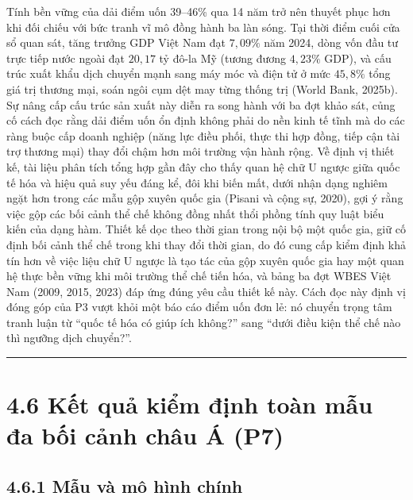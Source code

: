 \documentclass[
  a4paper,
  13pt]{extreport}
\begin{document}
Tính bền vững của dải điểm uốn 39--46\% qua 14 năm trở nên thuyết phục
hơn khi đối chiếu với bức tranh vĩ mô đồng hành ba làn sóng. Tại thời
điểm cuối cửa sổ quan sát, tăng trưởng GDP Việt Nam đạt \(7{,}09\%\) năm
2024, dòng vốn đầu tư trực tiếp nước ngoài đạt \(20{,}17\) tỷ đô-la Mỹ
(tương đương \(4{,}23\%\) GDP), và cấu trúc xuất khẩu dịch chuyển mạnh
sang máy móc và điện tử ở mức \(45{,}8\%\) tổng giá trị thương mại, soán
ngôi cụm dệt may từng thống trị (World Bank, 2025b). Sự nâng cấp cấu
trúc sản xuất này diễn ra song hành với ba đợt khảo sát, củng cố cách
đọc rằng dải điểm uốn ổn định không phải do nền kinh tế tĩnh mà do các
ràng buộc cấp doanh nghiệp (năng lực điều phối, thực thi hợp đồng, tiếp
cận tài trợ thương mại) thay đổi chậm hơn môi trường vận hành rộng. Về
định vị thiết kế, tài liệu phân tích tổng hợp gần đây cho thấy quan hệ
chữ U ngược giữa quốc tế hóa và hiệu quả suy yếu đáng kể, đôi khi biến
mất, dưới nhận dạng nghiêm ngặt hơn trong các mẫu gộp xuyên quốc gia
(Pisani và cộng sự, 2020), gợi ý rằng việc gộp các bối cảnh thể chế
không đồng nhất thổi phồng tính quy luật biểu kiến của dạng hàm. Thiết
kế dọc theo thời gian trong nội bộ một quốc gia, giữ cố định bối cảnh
thể chế trong khi thay đổi thời gian, do đó cung cấp kiểm định khả tín
hơn về việc liệu chữ U ngược là tạo tác của gộp xuyên quốc gia hay một
quan hệ thực bền vững khi môi trường thể chế tiến hóa, và bảng ba đợt
WBES Việt Nam (2009, 2015, 2023) đáp ứng đúng yêu cầu thiết kế này. Cách
đọc này định vị đóng góp của P3 vượt khỏi một báo cáo điểm uốn đơn lẻ:
nó chuyển trọng tâm tranh luận từ ``quốc tế hóa có giúp ích không?''
sang ``dưới điều kiện thể chế nào thì ngưỡng dịch chuyển?''.

\begin{center}\rule{0.5\linewidth}{0.5pt}\end{center}

\hypertarget{kux1ebft-quux1ea3-kiux1ec3m-ux111ux1ecbnh-touxe0n-mux1eabu-ux111a-bux1ed1i-cux1ea3nh-chuxe2u-uxe1-p7}{%
\section{4.6 Kết quả kiểm định toàn mẫu đa bối cảnh châu Á
(P7)}\label{kux1ebft-quux1ea3-kiux1ec3m-ux111ux1ecbnh-touxe0n-mux1eabu-ux111a-bux1ed1i-cux1ea3nh-chuxe2u-uxe1-p7}}

\hypertarget{mux1eabu-vuxe0-muxf4-huxecnh-chuxednh}{%
\subsection{4.6.1 Mẫu và mô hình
chính}\label{mux1eabu-vuxe0-muxf4-huxecnh-chuxednh}}
\end{document}
